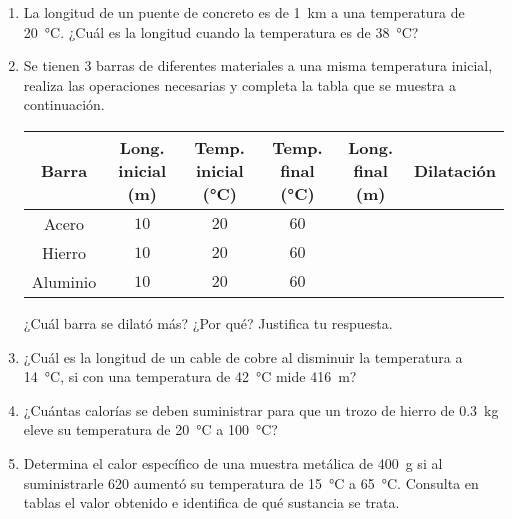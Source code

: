\documentclass[14pt]{extarticle}
\begin{document}
\begin{enumerate}
\item La longitud de un puente de concreto es de \SI{1}{\kilo\meter} a una temperatura de \SI{20}{\degreeCelsius}. ¿Cuál es la longitud cuando la temperatura es de \SI{38}{\degreeCelsius}?
\item Se tienen 3 barras de diferentes materiales a una misma temperatura inicial, realiza las operaciones necesarias y completa la tabla que se muestra a continuación.
\begin{table}[H]
\centering
\begin{tabular}{c | c | c | c | c | c}
Barra & \makecell{Long. inicial \\ (\unit{\meter})} & \makecell{Temp. inicial \\ (\unit{\degreeCelsius})} & \makecell{Temp. final \\ (\unit{\degreeCelsius})} & \makecell{Long. final \\ (\unit{\meter})} & Dilatación \\ \hline
Acero & $10$ & $20$ & $60$ & & \\ \hline
Hierro & $10$ & $20$ & $60$ & & \\ \hline
Aluminio & $10$ & $20$ & $60$ & & \\ \hline    
\end{tabular}
\end{table}
¿Cuál barra se dilató más? ¿Por qué? Justifica tu respuesta.
\item ¿Cuál es la longitud de un cable de cobre al disminuir la temperatura a \SI{14}{\degreeCelsius}, si con una temperatura de \SI{42}{\degreeCelsius} mide \SI{416}{\meter}?
\item ¿Cuántas calorías se deben suministrar para que un trozo de hierro de \SI{0.3}{\kilo\gram} eleve su temperatura de \SI{20}{\degreeCelsius} a \SI{100}{\degreeCelsius}?
\item Determina el calor específico de una muestra metálica de \SI{400}{\gram} si al suministrarle \SI{620}{\cal} aumentó su temperatura de \SI{15}{\degreeCelsius} a \SI{65}{\degreeCelsius}. Consulta en tablas el valor obtenido e identifica de qué sustancia se trata.
\end{enumerate}
\end{document}
